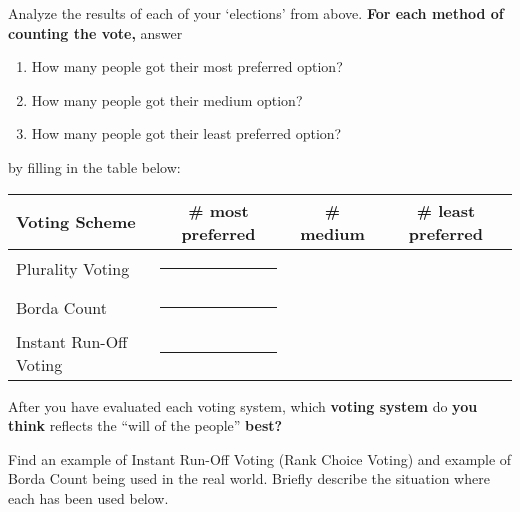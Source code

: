 \documentclass[nooutcomes,noauthor,hints,handout,12pt]{ximera}
\begin{document}
\begin{question}
  Analyze the results of each of your `elections' from above. \textbf{For each
  method of counting the vote,} answer
  \begin{enumerate}
  \item How many people got their most preferred option?
  \item How many people got their medium option? 
  \item How many people got their least preferred option?
  \end{enumerate}
  by filling in the table below:
  \begin{center}\renewcommand{\arraystretch}{1.5}
    \begin{tabular}{|l||c|c|c|}\hline
      Voting Scheme & \# most preferred & \# medium & \# least preferred \\ \hline\hline
      Plurality  Voting &  \rule[7mm]{10mm}{0mm}& & \\ \hline
      Borda Count &  \rule[7mm]{10mm}{0mm}&  & \\ \hline
      Instant Run-Off Voting & \rule[7mm]{10mm}{0mm}&  &\\\hline
    \end{tabular}
  \end{center}
  
  After you have evaluated each voting system, which \textbf{voting system} do
  \textbf{you think} reflects the ``will of the people'' \textbf{best?}
\end{question}
\mynewpage








\begin{question}
  Find an example of Instant Run-Off Voting (Rank Choice Voting) and
  example of Borda Count being used in the real world. Briefly
  describe the situation where each has been used below.
    
\end{question}
\end{document}
